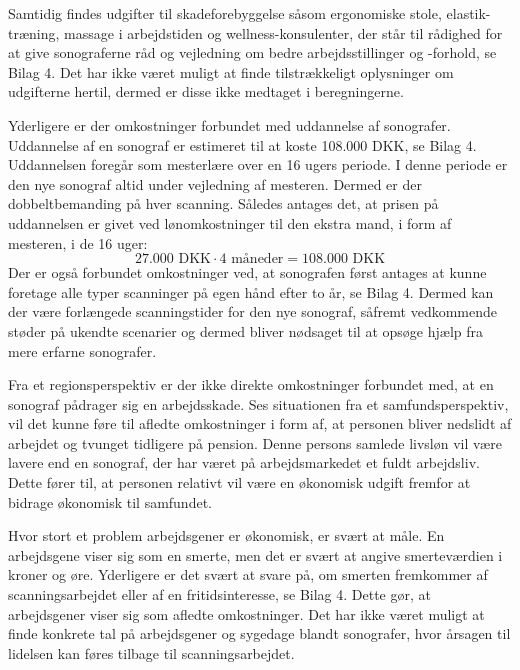Samtidig findes udgifter til skadeforebyggelse såsom ergonomiske stole, elastik-træning, massage i arbejdstiden og wellness-konsulenter, der står til rådighed for at give sonograferne råd og vejledning om bedre arbejdsstillinger og -forhold, se Bilag 4. Det har ikke været muligt at finde tilstrækkeligt oplysninger om udgifterne hertil, dermed er disse ikke medtaget i beregningerne. 

Yderligere er der omkostninger forbundet med uddannelse af sonografer. Uddannelse af en sonograf er estimeret til at koste 108.000 DKK, se Bilag 4. Uddannelsen foregår som mesterlære over en 16 ugers periode. I denne periode er den nye sonograf altid under vejledning af mesteren. Dermed er der dobbeltbemanding på hver scanning. Således antages det, at prisen på uddannelsen er givet ved lønomkostninger til den ekstra mand, i form af mesteren, i de 16 uger:
\begin{equation}
27.000 \text{ DKK}\cdot4 \text{ måneder} = 108.000 \text{ DKK}
\end{equation}
Der er også forbundet omkostninger ved, at sonografen først antages at kunne foretage alle typer scanninger på egen hånd efter to år, se Bilag 4. Dermed kan der være forlængede scanningstider for den nye sonograf, såfremt vedkommende støder på ukendte scenarier og dermed bliver nødsaget til at opsøge hjælp fra mere erfarne sonografer.

Fra et regionsperspektiv er der ikke direkte omkostninger forbundet med, at en sonograf pådrager sig en arbejdsskade. Ses situationen fra et samfundsperspektiv, vil det kunne føre til afledte omkostninger i form af, at personen bliver nedslidt af arbejdet og tvunget tidligere på pension. Denne persons samlede livsløn vil være lavere end en sonograf, der har været på arbejdsmarkedet et fuldt arbejdsliv. Dette fører til, at personen relativt vil være en økonomisk udgift fremfor at bidrage økonomisk til samfundet. 

Hvor stort et problem arbejdsgener er økonomisk, er svært at måle. En arbejdsgene viser sig som en smerte, men det er svært at angive smerteværdien i kroner og øre. Yderligere er det svært
at svare på, om smerten fremkommer af scanningsarbejdet eller af en fritidsinteresse, se Bilag 4. Dette gør, at arbejdsgener viser sig som afledte omkostninger. Det har ikke været muligt at finde konkrete tal på arbejdsgener og sygedage blandt sonografer, hvor årsagen til lidelsen kan føres tilbage til scanningsarbejdet.  

